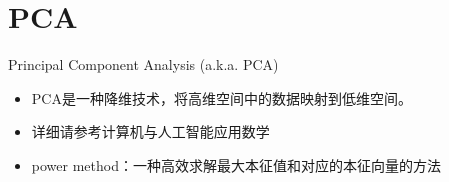 \section{PCA}

\begin{frame}{Principal Component Analysis (a.k.a. PCA)}
\begin{itemize}
    \item PCA是一种降维技术，将高维空间中的数据映射到低维空间。
    \item 详细请参考计算机与人工智能应用数学
    \item power method：一种高效求解最大本征值和对应的本征向量的方法
\end{itemize}
\end{frame}